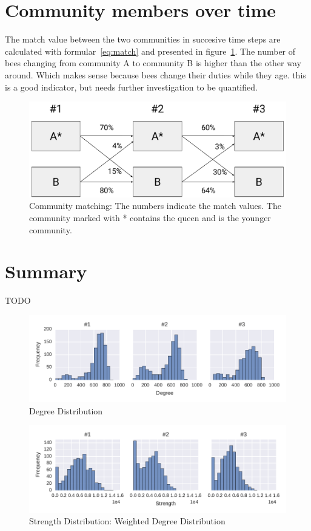 \section{Community members over time}
 The match value between the two communities in succesive time steps are calculated with formular~\ref{eq:match} and presented in figure~\ref{fig:members}. The number of bees changing from community A to community B is higher than the other way around. Which makes sense because bees change their duties while they age. this is a good indicator, but needs further investigation to be quantified.

\begin{figure}[htb]
	\centering
	\includegraphics[width=.8\textwidth]{Figures/members}
	\caption[Community matching]{Community matching: The numbers indicate the match values. The community marked with * contains the queen and is the younger community.}
	\label{fig:members}
\end{figure}


\section{Summary}
TODO




\begin{figure}[htb]
	\centering
	\includegraphics[width=1.0\textwidth]{Figures/stat-degreeDist}
	\caption[Degree Distribution]{Degree Distribution}
	\label{fig:statDegreeDist}
\end{figure}


\begin{figure}[htb]
	\centering
	\includegraphics[width=1.0\textwidth]{Figures/stat-strengthDist}
	\caption[Strength Distribution]{Strength Distribution: Weighted Degree Distribution}
	\label{fig:statStrengthDist}
\end{figure}

